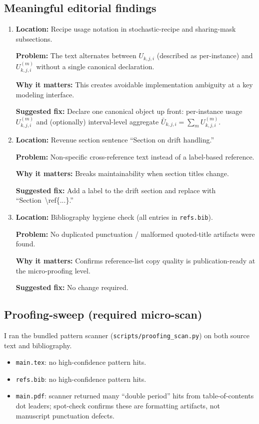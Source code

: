 \documentclass[11pt]{article}
\begin{document}
\subsection*{Meaningful editorial findings}
\begin{enumerate}[leftmargin=*]
\item \textbf{Location:} Recipe usage notation in stochastic-recipe and sharing-mask subsections.

\textbf{Problem:} The text alternates between $U_{k,j,i}$ (described as per-instance) and $U^{(m)}_{k,j,i}$ without a single canonical declaration.

\textbf{Why it matters:} This creates avoidable implementation ambiguity at a key modeling interface.

\textbf{Suggested fix:} Declare one canonical object up front: per-instance usage $U^{(m)}_{k,j,i}$ and (optionally) interval-level aggregate $\bar U_{k,j,i}=\sum_m U^{(m)}_{k,j,i}$.

\item \textbf{Location:} Revenue section sentence ``Section on drift handling.''

\textbf{Problem:} Non-specific cross-reference text instead of a label-based reference.

\textbf{Why it matters:} Breaks maintainability when section titles change.

\textbf{Suggested fix:} Add a label to the drift section and replace with ``Section~\textbackslash ref\{...\}.''

\item \textbf{Location:} Bibliography hygiene check (all entries in \texttt{refs.bib}).

\textbf{Problem:} No duplicated punctuation / malformed quoted-title artifacts were found.

\textbf{Why it matters:} Confirms reference-list copy quality is publication-ready at the micro-proofing level.

\textbf{Suggested fix:} No change required.
\end{enumerate}

\subsection*{Proofing-sweep (required micro-scan)}
I ran the bundled pattern scanner (\texttt{scripts/proofing\_scan.py}) on both source text and bibliography.

\begin{itemize}[leftmargin=*]
\item \texttt{main.tex}: no high-confidence pattern hits.
\item \texttt{refs.bib}: no high-confidence pattern hits.
\item \texttt{main.pdf}: scanner returned many ``double period'' hits from table-of-contents dot leaders; spot-check confirms these are formatting artifacts, not manuscript punctuation defects.
\end{itemize}
\end{document}

